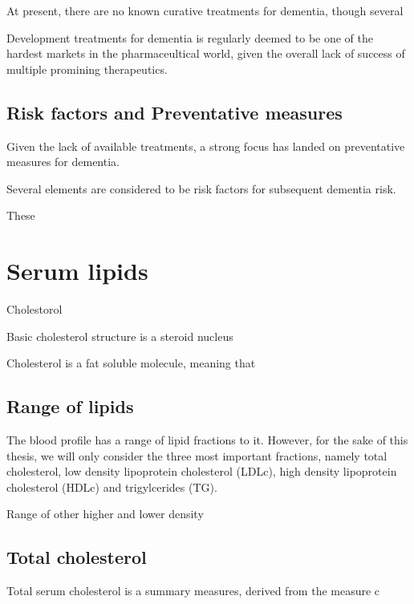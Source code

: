 \documentclass[a4paper,nobind]{templates/ociamthesis}
\begin{document}
At present, there are no known curative treatments for dementia, though several

Development treatments for dementia is regularly deemed to be one of the hardest markets in the pharmaceultical world, given the overall lack of success of multiple promining therapeutics.

\hypertarget{risk-factors-and-preventative-measures}{%
\subsection{Risk factors and Preventative measures}\label{risk-factors-and-preventative-measures}}

Given the lack of available treatments, a strong focus has landed on preventative measures for dementia.

Several elements are considered to be risk factors for subsequent dementia risk.

These

\hypertarget{serum-lipids}{%
\section{Serum lipids}\label{serum-lipids}}

Cholestorol

Basic cholesterol structure is a steroid nucleus

Cholesterol is a fat soluble molecule, meaning that

\hypertarget{range-of-lipids}{%
\subsection{Range of lipids}\label{range-of-lipids}}

The blood profile has a range of lipid fractions to it. However, for the sake of this thesis, we will only consider the three most important fractions, namely total cholesterol, low density lipoprotein cholesterol (LDLc), high density lipoprotein cholesterol (HDLc) and trigylcerides (TG).

Range of other higher and lower density

\hypertarget{total-cholesterol}{%
\subsection{Total cholesterol}\label{total-cholesterol}}

Total serum cholesterol is a summary measures, derived from the measure c
\end{document}
